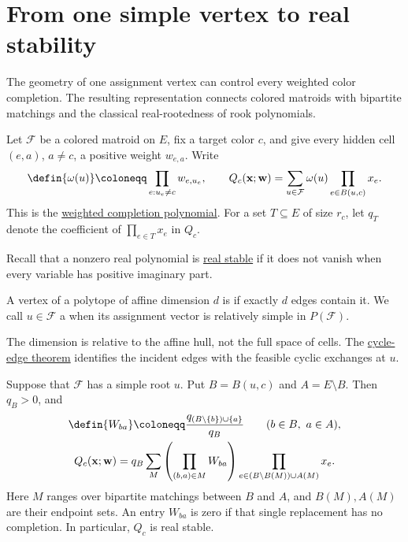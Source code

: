 
\section[simpleVertexStability]{From one simple vertex to real stability}

The geometry of one assignment vertex can control every weighted color
completion. The resulting representation connects colored matroids with
bipartite matchings and the classical real-rootedness of rook polynomials.

Let $\mathcal F$ be a colored matroid on $E$, fix a target color $c$, and
give every hidden cell $(e,a)$, $a\ne c$, a positive weight $w_{e,a}$.
Write
\[
 \defin{\omega(u)}\coloneqq\prod_{e:u_e\ne c}w_{e,u_e},\qquad
 Q_c(\mathbf x;\mathbf w)
 =\sum_{u\in\mathcal F}\omega(u)\prod_{e\in B(u,c)}x_e.
\]
This is the \href{rank.htm#completionPolynomials}{weighted completion
polynomial}. For a set $T\subseteq E$ of size $r_c$, let $q_T$ denote
the coefficient of $\prod_{e\in T}x_e$ in $Q_c$.

Recall that a nonzero real polynomial is
\href{series-parallel.htm#seriesParallelLift}{real stable} if it does
not vanish when every variable has positive imaginary part.

\begin{definition}
A vertex of a polytope of affine dimension $d$ is
 if exactly $d$ edges contain it.
We call $u\in\mathcal F$ a  when its assignment vector
is relatively simple in $P(\mathcal F)$.
\end{definition}

The dimension is relative to the affine hull, not the full space of cells.
The \href{polytope.htm#polytopeEdges}{cycle-edge theorem} identifies the
incident edges with the feasible cyclic exchanges at $u$.

\begin{theorem}
Suppose that $\mathcal F$ has a simple root $u$. Put
$B=B(u,c)$ and $A=E\setminus B$. Then $q_B>0$, and
\[
 \begin{gathered}
 \defin{W_{ba}}\coloneqq\frac{q_{(B\setminus\{b\})\cup\{a\}}}{q_B}
 \qquad(b\in B,\ a\in A),\\
 Q_c(\mathbf x;\mathbf w)
 =q_B\sum_M\left(\prod_{(b,a)\in M}W_{ba}\right)
       \prod_{e\in(B\setminus B(M))\cup A(M)}x_e.
 \end{gathered}
\]
Here $M$ ranges over bipartite matchings between $B$ and $A$, and
$B(M),A(M)$ are their endpoint sets. An entry $W_{ba}$ is zero if that
single replacement has no completion. In particular, $Q_c$ is real stable.
\end{theorem}

